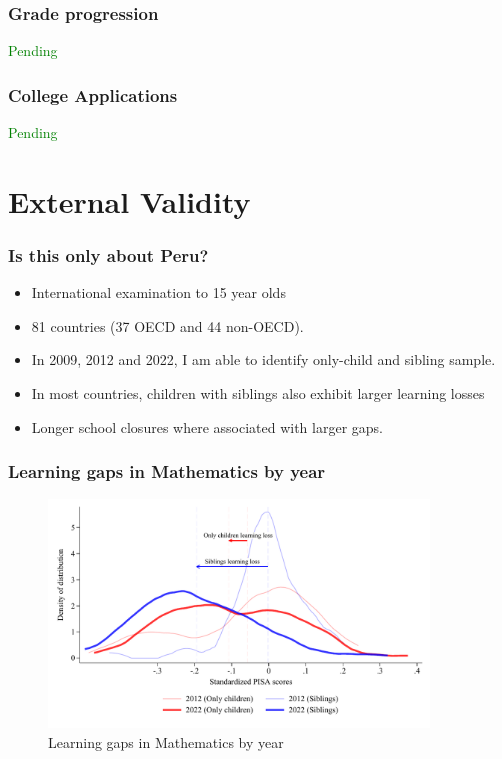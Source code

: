 \documentclass{beamer}
\begin{document}
    \begin{frame}
            \label{frame:grade_progression}
            \frametitle{Grade progression}
   \textcolor{green}{Pending}
    \end{frame}   

    \begin{frame}
            \label{frame:college_app}
            \frametitle{College Applications}
   \textcolor{green}{Pending}
    \end{frame}      

\section{External Validity}

    \begin{frame}
            \label{frame:pisadata}
            \frametitle{Is this only about Peru?}
        \begin{itemize}
            \item International examination to 15 year olds
            \item 81 countries (37 OECD and 44 non-OECD).
            \item In 2009, 2012 and 2022, I am able to identify only-child and sibling sample.
            \item In most countries, children with siblings also exhibit larger learning losses
            \item Longer school closures where associated with larger gaps.
        \end{itemize}
    \end{frame}

\begin{frame}
    \label{frame:pisagaps}
    \frametitle{Learning gaps in Mathematics by year}
    
    \begin{figure}
        \centering
        \includegraphics[width=0.9\textwidth]{./FIGURES/Descriptive/PISA_distribution_2012_2022_PV4MATH.pdf}
        \caption{Learning gaps in Mathematics by year}
        \label{fig:1a}
    \end{figure}
    
\end{frame}
\end{document}
